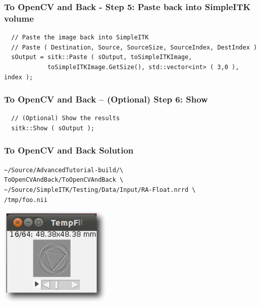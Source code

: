 \begin{frame}[fragile]
\frametitle{To OpenCV and Back - Step 5: Paste back into SimpleITK volume}
\begin{lstlisting}
  // Paste the image back into SimpleITK
  // Paste ( Destination, Source, SourceSize, SourceIndex, DestIndex )
  sOutput = sitk::Paste ( sOutput, toSimpleITKImage,
            toSimpleITKImage.GetSize(), std::vector<int> ( 3,0 ), index );
\end{lstlisting}
\end{frame}

\begin{frame}[fragile]
\frametitle{To OpenCV and Back -- (Optional) Step 6: Show}
\begin{lstlisting}
  // (Optional) Show the results
  sitk::Show ( sOutput );
\end{lstlisting}
\end{frame}

\begin{frame}[fragile]
\frametitle{To OpenCV and Back Solution}
\texttt{\textasciitilde/Source/AdvancedTutorial-build/\textbackslash\\
ToOpenCVAndBack/ToOpenCVAndBack \textbackslash \\
  \textasciitilde/Source/SimpleITK/Testing/Data/Input/RA-Float.nrrd \textbackslash \\
  /tmp/foo.nii}
\begin{center}
  \includegraphics[width=0.4\textwidth]{Images/ToOpenCVAndBackSolution_shadow}
\end{center}
\end{frame}


